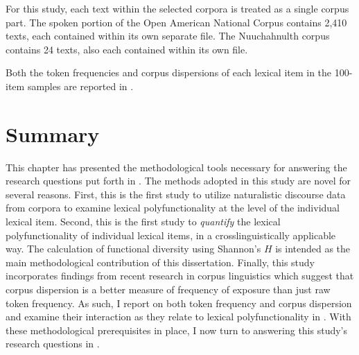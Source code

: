 For this study, each text within the selected corpora is treated as a single corpus part. The spoken portion of the Open American National Corpus contains 2,410 texts, each contained within its own separate file. The Nuuchahnulth corpus contains 24 texts, also each contained within its own file.

Both the token frequencies and corpus dispersions of each lexical item in the 100-item samples are reported in .

\section{Summary}
\label{sec:3.5}

This chapter has presented the methodological tools necessary for answering the research questions put forth in . The methods adopted in this study are novel for several reasons. First, this is the first study to utilize naturalistic discourse data from corpora to examine lexical polyfunctionality at the level of the individual lexical item. Second, this is the first study to \emph{quantify} the lexical polyfunctionality of individual lexical items, in a crosslinguistically applicable way. The calculation of functional diversity using Shannon's $H$ is intended as the main methodological contribution of this dissertation. Finally, this study incorporates findings from recent research in corpus linguistics which suggest that corpus dispersion is a better measure of frequency of exposure than just raw token frequency. As such, I report on both token frequency and corpus dispersion and examine their interaction as they relate to lexical polyfunctionality in . With these methodological prerequisites in place, I now turn to answering this study's research questions in .
